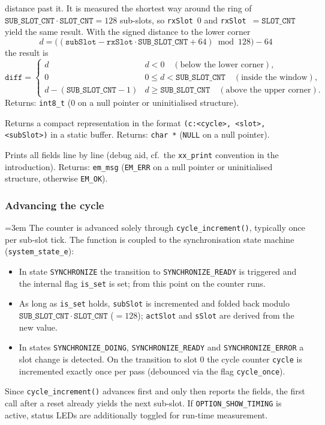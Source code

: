\begin{description}
  distance past it. It is measured the shortest way around the ring of
  $\mathtt{SUB\_SLOT\_CNT} \cdot \mathtt{SLOT\_CNT} = 128$ sub-slots, so
  \verb|rxSlot|~$0$ and \verb|rxSlot|~$=\mathtt{SLOT\_CNT}$ yield the same
  result. With the signed distance to the lower corner
  \[
    d = \big((\mathtt{subSlot} - \mathtt{rxSlot} \cdot
    \mathtt{SUB\_SLOT\_CNT} + 64) \bmod 128\big) - 64
  \]
  the result is
  \[
    \mathtt{diff} =
    \begin{cases}
      d & d < 0 \quad(\text{below the lower corner}),\\
      0 & 0 \le d < \mathtt{SUB\_SLOT\_CNT} \quad(\text{inside the window}),\\
      d - (\mathtt{SUB\_SLOT\_CNT}-1) & d \ge \mathtt{SUB\_SLOT\_CNT}
        \quad(\text{above the upper corner}).
    \end{cases}
  \]
  Returns: \verb|int8_t| ($0$ on a null pointer or uninitialised structure).
\item[\texttt{cycle\_string(cycle)}] Returns a compact representation in the
  format \verb|(c:<cycle>, <slot>, <subSlot>)| in a static buffer. Returns:
  \verb|char *| (\verb|NULL| on a null pointer).
\item[\texttt{cycle\_print(cycle, title)}] Prints all fields line by line
  (debug aid, cf.\ the \verb|xx_print| convention in the introduction).
  Returns: \verb|em_msg| (\verb|EM_ERR| on a null pointer or uninitialised
  structure, otherwise \verb|EM_OK|).
\end{description}

\subsubsection*{Advancing the cycle}
{\sloppy\emergencystretch=3em
The counter is advanced solely through \verb|cycle_increment()|, typically
once per sub-slot tick. The function is coupled to the synchronisation state
machine (\verb|system_state_e|):

\begin{itemize}
\item In state \verb|SYNCHRONIZE| the transition to \verb|SYNCHRONIZE_READY| is
  triggered and the internal flag \verb|is_set| is set; from this point on the
  counter runs.
\item As long as \verb|is_set| holds, \verb|subSlot| is incremented and folded
  back modulo $\mathtt{SUB\_SLOT\_CNT} \cdot \mathtt{SLOT\_CNT}$ ($=128$);
  \verb|actSlot| and \verb|sSlot| are derived from the new value.
\item In states \verb|SYNCHRONIZE_DOING|, \verb|SYNCHRONIZE_READY| and
  \verb|SYNCHRONIZE_ERROR| a slot change is detected. On the transition to
  slot $0$ the cycle counter \verb|cycle| is incremented exactly once per pass
  (debounced via the flag \verb|cycle_once|).
\end{itemize}
\par}

\noindent Since \verb|cycle_increment()| advances first and only then reports
the fields, the first call after a reset already yields the next sub-slot. If
\verb|OPTION_SHOW_TIMING| is active, status LEDs are additionally toggled for
run-time measurement.
